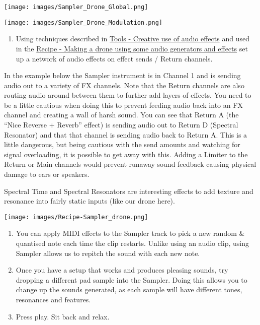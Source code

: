 \documentclass[
  12pt,
  letterpaper,
  oneside,
  open=any]{scrbook}
\providecommand{\tightlist}{%
  \setlength{\itemsep}{0pt}\setlength{\parskip}{0pt}}\usepackage{longtable,booktabs,array}
\begin{document}
\texttt{[image: images/Sampler\_Drone\_Global.png]}

\texttt{[image: images/Sampler\_Drone\_Modulation.png]}

\begin{enumerate}
\def\labelenumi{\arabic{enumi}.}
\setcounter{enumi}{3}
\tightlist
\item
  Using techniques described in
  \hyperref[Chapter-015-Tools-Audio_Effects]{Tools - Creative use of
  audio effects} and used in the
  \hyperref[Chapter-017-Recipe-Audio_generators_drone]{Recipe - Making a
  drone using some audio generators and effects} set up a network of
  audio effects on effect sends / Return channels.
\end{enumerate}

In the example below the Sampler instrument is in Channel 1 and is
sending audio out to a variety of FX channels. Note that the Return
channels are also routing audio around between them to further add
layers of effects. You need to be a little cautious when doing this to
prevent feeding audio back into an FX channel and creating a wall of
harsh sound. You can see that Return A (the ``Nice Reverse + Reverb''
effect) is sending audio out to Return D (Spectral Resonator) and that
that channel is sending audio back to Return A. This is a little
dangerous, but being cautious with the send amounts and watching for
signal overloading, it is possible to get away with this. Adding a
Limiter to the Return or Main channels would prevent runaway sound
feedback causing physical damage to ears or speakers.

Spectral Time and Spectral Resonators are interesting effects to add
texture and resonance into fairly static inputs (like our drone here).

\texttt{[image: images/Recipe-Sampler\_drone.png]}

\begin{enumerate}
\def\labelenumi{\arabic{enumi}.}
\setcounter{enumi}{4}
\item
  You can apply MIDI effects to the Sampler track to pick a new random
  \& quantised note each time the clip restarts. Unlike using an audio
  clip, using Sampler allows us to repitch the sound with each new note.
\item
  Once you have a setup that works and produces pleasing sounds, try
  dropping a different pad sample into the Sampler. Doing this allows
  you to change up the sounds generated, as each sample will have
  different tones, resonances and features.
\item
  Press play. Sit back and relax.
\end{enumerate}
\end{document}
